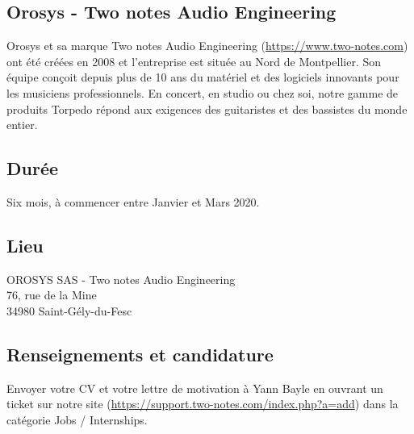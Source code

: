 \documentclass[12pt, a4paper]{article}
\begin{document}
\subsection*{Orosys - Two notes Audio Engineering}

Orosys et sa marque Two notes Audio Engineering (\url{https://www.two-notes.com}) ont été créées en 2008 et l'entreprise est située au Nord de Montpellier.
Son équipe conçoit depuis plus de 10 ans du matériel et des logiciels innovants pour les musiciens professionnels.
En concert, en studio ou chez soi, notre gamme de produits Torpedo répond aux exigences des guitaristes et des bassistes du monde entier. 

\subsection*{Durée}

Six mois, à commencer entre Janvier et Mars 2020.

\subsection*{Lieu}

OROSYS SAS - Two notes Audio Engineering \\
76, rue de la Mine \\
34980 Saint-Gély-du-Fesc

\subsection*{Renseignements et candidature}

Envoyer votre CV et votre lettre de motivation à Yann Bayle en ouvrant un ticket sur notre site (\url{https://support.two-notes.com/index.php?a=add}) dans la catégorie Jobs / Internships.
\end{document}
